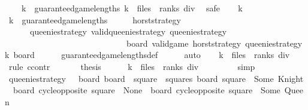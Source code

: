 \begin{isabellebody}
\ \ \ {\isachardoublequoteopen}{\isasymforall}\ k\ {\isasymin}\ guaranteed{\isacharunderscore}game{\isacharunderscore}lengths{\isachardot}\ k\ {\isasymle}\ {\isacharparenleft}files\ {\isacharasterisk}\ ranks{\isacharparenright}\ div\ {}{\isachardoublequoteclose}\isanewline
%
\isadelimproof
%
\endisadelimproof
%
\isatagproof
{}\isamarkupfalse%
\ safe\isanewline
\ \ \isamarkupfalse%
\ k\isanewline
\ \ \isamarkupfalse%
\ {\isachardoublequoteopen}k\ {\isasymin}\ guaranteed{\isacharunderscore}game{\isacharunderscore}lengths{\isachardoublequoteclose}\isanewline
\ \ \isamarkupfalse%
\ \isamarkupfalse%
\ horst{\isacharunderscore}strategy\ \isanewline
\ \ \ \ {\isacharasterisk}{\isacharcolon}\ {\isachardoublequoteopen}{\isasymforall}\ queenie{\isacharunderscore}strategy{\isachardot}\ valid{\isacharunderscore}queenie{\isacharunderscore}strategy\ queenie{\isacharunderscore}strategy\ {\isasymlongrightarrow}\ \isanewline
\ \ \ \ \ \ \ \ \ \ \ \ \ \ \ \ \ \ \ \ \ \ \ \ \ \ \ \ {\isacharparenleft}{\isasymexists}\ board{\isachardot}\ valid{\isacharunderscore}game\ horst{\isacharunderscore}strategy\ queenie{\isacharunderscore}strategy\ k\ board{\isacharparenright}{\isachardoublequoteclose}\isanewline
\ \ \ \ \isamarkupfalse%
\ guaranteed{\isacharunderscore}game{\isacharunderscore}lengths{\isacharunderscore}def\isanewline
\ \ \ \ \isamarkupfalse%
\ auto\isanewline
\ \ \isamarkupfalse%
\ {\isachardoublequoteopen}k\ {\isasymle}\ {\isacharparenleft}files\ {\isacharasterisk}\ ranks{\isacharparenright}\ div\ {}{\isachardoublequoteclose}\isanewline
\ \ \isamarkupfalse%
\ {\isacharparenleft}rule\ ccontr{\isacharparenright}\isanewline
\ \ \ \ \isamarkupfalse%
\ {\isachardoublequoteopen}{\isasymnot}\ {\isacharquery}thesis{\isachardoublequoteclose}\isanewline
\ \ \ \ \isamarkupfalse%
\ {\isachardoublequoteopen}k\ {\isachargreater}\ {\isacharparenleft}files\ {\isacharasterisk}\ ranks{\isacharparenright}\ div\ {}{\isachardoublequoteclose}\isanewline
\ \ \ \ \ \ \isamarkupfalse%
\ simp\isanewline
\isanewline
\ \ \ \ \isamarkupfalse%
\ {\isacharquery}queenie{\isacharunderscore}strategy\ {\isacharequal}\ {\isachardoublequoteopen}{\isasymlambda}\ board\ board{\isacharprime}{\isachardot}\ {\isacharparenleft}{\isasymexists}\ square\ {\isasymin}\ squares{\isachardot}\ board\ square\ {\isacharequal}\ Some\ Knight\ {\isasymand}\ board\ {\isacharparenleft}cycle{\isacharunderscore}opposite\ square{\isacharparenright}\ {\isacharequal}\ None\ {\isasymand}\ board{\isacharprime}\ {\isacharparenleft}cycle{\isacharunderscore}opposite\ square{\isacharparenright}\ {\isacharequal}\ Some\ Queen{\isacharparenright}{\isachardoublequoteclose}\isanewline

\end{isabellebody}

